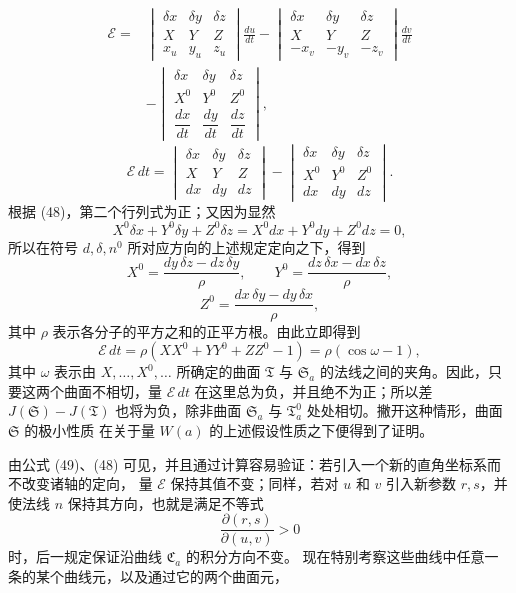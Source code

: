 \documentclass[11pt,a4paper,leqno]{article}
\begin{document}
\[
\begin{aligned}
\mathcal{E}={}&
\begin{vmatrix}
\delta x&\delta y&\delta z\\ X&Y&Z\\ x_u&y_u&z_u
\end{vmatrix}\frac{du}{dt}
-\begin{vmatrix}
\delta x&\delta y&\delta z\\ X&Y&Z\\ -x_v&-y_v&-z_v
\end{vmatrix}\frac{dv}{dt}\\
&-\begin{vmatrix}
\delta x&\delta y&\delta z\\ X^0&Y^0&Z^0\\
\dfrac{dx}{dt}&\dfrac{dy}{dt}&\dfrac{dz}{dt}
\end{vmatrix},
\end{aligned}
\]
\[
\mathcal{E}\,dt=
\begin{vmatrix}
\delta x&\delta y&\delta z\\ X&Y&Z\\ dx&dy&dz
\end{vmatrix}
-\begin{vmatrix}
\delta x&\delta y&\delta z\\ X^0&Y^0&Z^0\\ dx&dy&dz
\end{vmatrix}.
\]
根据 (48)，第二个行列式为正；又因为显然
\[
X^0\delta x+Y^0\delta y+Z^0\delta z
=X^0dx+Y^0dy+Z^0dz=0,
\]
所以在符号 $d,\delta,n^0$ 所对应方向的上述规定定向之下，得到
\[
X^0=\frac{dy\,\delta z-dz\,\delta y}{\rho},\qquad
Y^0=\frac{dz\,\delta x-dx\,\delta z}{\rho},
\]
\[
Z^0=\frac{dx\,\delta y-dy\,\delta x}{\rho},
\]
其中 $\rho$ 表示各分子的平方之和的正平方根。由此立即得到
\[
\mathcal{E}\,dt=\rho(XX^0+YY^0+ZZ^0-1)=\rho(\cos\omega-1),
\]
其中 $\omega$ 表示由 $X,\ldots,X^0,\ldots$ 所确定的曲面 $\mathfrak{T}$ 与
$\mathfrak{S}_a$ 的法线之间的夹角。因此，只要这两个曲面不相切，量
$\mathcal{E}\,dt$ 在这里总为负，并且绝不为正；所以差
$J(\mathfrak{S})-J(\mathfrak{T})$ 也将为负，除非曲面 $\mathfrak{S}_a$
与 $\mathfrak{T}_a^0$ 处处相切。撇开这种情形，曲面 $\mathfrak{S}$ 的极小性质
在关于量 $W(a)$ 的上述假设性质之下便得到了证明。

由公式 (49)、(48) 可见，并且通过计算容易验证：若引入一个新的直角坐标系而不改变诸轴的定向，
量 $\mathcal{E}$ 保持其值不变；同样，若对 $u$ 和 $v$ 引入新参数 $r,s$，并使法线 $n$
保持其方向，也就是满足不等式
\begin{equation}\tag{50}
\frac{\partial(r,s)}{\partial(u,v)}>0
\end{equation}
时，后一规定保证沿曲线 $\mathfrak{C}_a$ 的积分方向不变。
现在特别考察这些曲线中任意一条的某个曲线元，以及通过它的两个曲面元，
\end{document}
